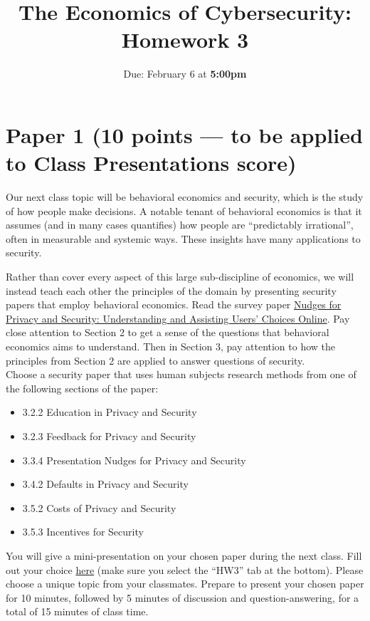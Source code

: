 \documentclass[11pt]{article}
\title{The Economics of Cybersecurity: Homework 3}
\date{Due: February 6 at {\bf 5:00pm}}
\author{}
\begin{document}
\maketitle


\section*{Paper 1 (10 points --- to be applied to Class Presentations score)}

Our next class topic will be behavioral economics and security, which is the study of how people make decisions. A notable tenant of behavioral economics is that it assumes (and in many cases quantifies) how people are ``predictably irrational'', often in measurable and systemic ways. These insights have many applications to security.

Rather than cover every aspect of this large sub-discipline of economics, we will instead teach each other the principles of the domain by presenting security papers that employ behavioral economics. Read the survey paper \href{https://dl.acm.org/doi/abs/10.1145/3054926}{Nudges for Privacy and Security: Understanding and Assisting Users' Choices Online}. Pay close attention to Section 2 to get a sense of the questions that behavioral economics aims to understand. Then in Section 3, pay attention to how the principles from Section 2 are applied to answer questions of security. 
\\ 

\noindent Choose a security paper that uses human subjects research methods from one of the following sections of the paper:

\begin{itemize}
    \item 3.2.2 Education in Privacy and Security
    \item 3.2.3 Feedback for Privacy and Security
    \item 3.3.4 Presentation Nudges for Privacy and Security
    \item 3.4.2 Defaults in Privacy and Security
    \item 3.5.2 Costs of Privacy and Security
    \item 3.5.3 Incentives for Security
\end{itemize}


You will give a mini-presentation on your chosen paper during the next class. Fill out your choice \href{https://docs.google.com/spreadsheets/d/1SdaMpeCo4CE8o0U_irGhWmVXJYHybRWoiX4uwZYMhCE/edit?usp=sharing}{here} (make sure you select the ``HW3'' tab at the bottom). Please choose a unique topic from your classmates. Prepare to present your chosen paper for 10 minutes, followed by 5 minutes of discussion and question-answering, for a total of 15 minutes of class time.
\end{document}
